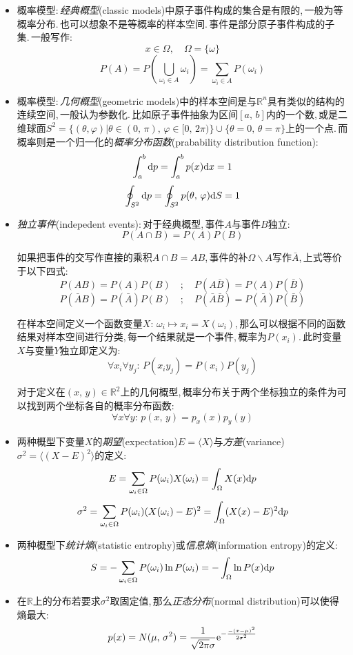 \begin{itemize}
	\item 概率模型:\,\emph{经典概型}(classic models)中原子事件构成的集合是有限的,\,一般为等概率分布.\,也可以想象不是等概率的样本空间.\,事件是部分原子事件构成的子集.\,一般写作:
	\[x\in \Omega,\quad \Omega=\{\omega\}\]
	\[P(A)=P(\bigcup_{\omega_i\in A} {\omega_i})=\sum_{\omega_i\in A} P(\omega_i)\]
	\item 概率模型:\,\emph{几何概型}(geometric models)中的样本空间是与\(\mathbb{R}^n\)具有类似的结构的连续空间,\,一般认为参数化.\,比如原子事件抽象为区间$[a,\,b]$内的一个数,\,或是二维球面$S^2=\{(\theta,\varphi)|\theta\in(0,\,\pi),\,\varphi\in[0,\,2\pi)\}\cup\{\theta=0,\,\theta=\pi\}$上的一个点.\,而概率则是一个归一化的\emph{概率分布函数}(prabability distribution function):
	\[\int_a^b \textrm{d} p=\int_a^b p(x)\textrm{d} x=1\]
	\[\oint_{S^2} \textrm{d} p=\oint_{S^2} p(\theta,\, \varphi)\textrm{d} S=1\]

	\item \emph{独立事件}(indepedent events):\,对于经典概型,\,事件$A$与事件$B$独立:
	\[P(A\cap B)=P(A)P(B)\]

	如果把事件的交写作直接的乘积$A\cap B=AB$,\,事件的补$\Omega\backslash A$写作$\bar{A}$,\,上式等价于以下四式:
	\[P(AB)=P(A)P(B)\quad ;\quad P(A\bar{B})=P(A)P(\bar{B})\]
	\[P(\bar{A}B)=P(\bar{A})P(B)\quad ;\quad P(\bar{A}\bar{B})=P(\bar{A})P(\bar{B})\]

	在样本空间定义一个函数变量$X:\,\omega_i\mapsto x_i=X(\omega_i)$,\,那么可以根据不同的函数结果对样本空间进行分类,\,每一个结果就是一个事件,\,概率为$P(x_i)$.\,此时变量$X$与变量$Y$独立即定义为:
	\[\forall x_i\forall y_j:\,P(x_iy_j)=P(x_i)P(y_j)\]

	对于定义在$(x,\,y)\in \mathbb{R}^2$上的几何概型,\,概率分布关于两个坐标独立的条件为可以找到两个坐标各自的概率分布函数:
	\[\forall x\forall y :\,p(x,\,y)=p_x(x)p_y(y)\]

	\item 两种概型下变量$X$的\emph{期望}(expectation)$E=\langle X\rangle $与\emph{方差}(variance)$\sigma^2=\langle (X-E)^2\rangle$的定义:
	\[E=\sum_{\omega_i\in \Omega} P(\omega_i)X(\omega_i)=\int_\Omega X(x)\textrm{d} p\]
	\[\sigma^2 =\sum_{\omega_i\in \Omega} P(\omega_i)(X(\omega_i)-E)^2=\int_\Omega (X(x)-E)^2\textrm{d} p\]

	\item 两种概型下\emph{统计熵}(statistic entrophy)或\emph{信息熵}(information entropy)的定义:
	\[S=-\sum_{\omega_i\in \Omega} P(\omega_i)\ln P(\omega_i)=-\int_\Omega \ln P(x)\textrm{d} p\]

	\item 在$\mathbb{R}$上的分布若要求$\sigma^2$取固定值,\,那么\emph{正态分布}(normal distribution)可以使得熵最大:
	\[p(x)=N(\mu,\,\sigma^2)=\frac{1}{\sqrt{2\pi }\sigma }{\rm e}^{-\frac{-(x-\mu)^2}{2\sigma^2}}\]


\end{itemize}
